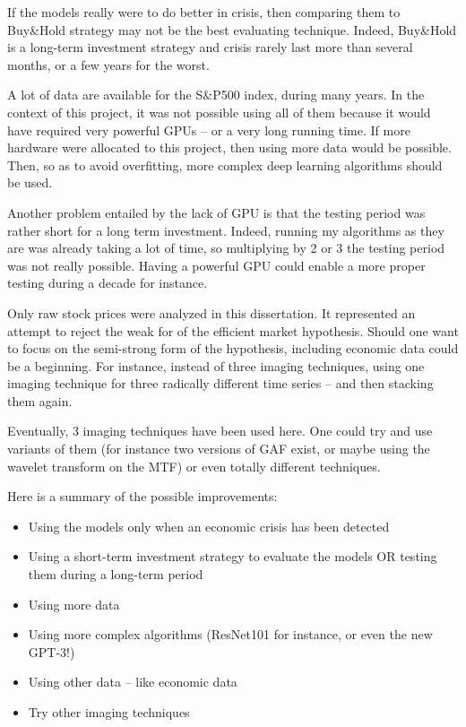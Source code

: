 \documentclass[11pt]{article}
\begin{document}
\begin{onehalfspace}
If the models really were to do better in crisis, then comparing them to Buy\&Hold strategy may not be the best evaluating technique. Indeed, Buy\&Hold is a long-term investment strategy and crisis rarely last more than several months, or a few years for the worst. 

A lot of data are available for the S\&P500 index, during many years. In the context of this project, it was not possible using all of them because it would have required very powerful GPUs -- or a very long running time. If more hardware were allocated to this project, then using more data would be possible. Then, so as to avoid overfitting, more complex deep learning algorithms should be used. 

Another problem entailed by the lack of GPU is that the testing period was rather short for a long term investment. Indeed, running my algorithms as they are was already taking a lot of time, so multiplying by 2 or 3 the testing period was not really possible. Having a powerful GPU could enable a more proper testing during a decade for instance.

Only raw stock prices were analyzed in this dissertation. It represented an attempt to reject the weak for of the efficient market hypothesis. Should one want to focus on the semi-strong form of the hypothesis, including economic data could be a beginning. For instance, instead of three imaging techniques, using one imaging technique for three radically different time series -- and then stacking them again.

Eventually, 3 imaging techniques have been used here. One could try and use variants of them (for instance two versions of GAF exist, or maybe using the wavelet transform on the MTF) or even totally different techniques.

Here is a summary of the possible improvements:

\begin{itemize}
    \item Using the models only when an economic crisis has been detected
    \item Using a short-term investment strategy to evaluate the models OR testing them during a long-term period
    \item Using more data
    \item Using more complex algorithms (ResNet101 for instance, or even the new GPT-3!)
    \item Using other data -- like economic data
    \item Try other imaging techniques
\end{itemize}


\end{onehalfspace}
\end{document}
